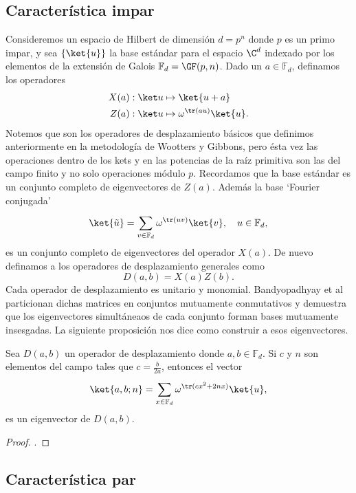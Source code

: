   \subsection{Característica impar}

  Consideremos un espacio de Hilbert de dimensión $d =
  p^{n}$ donde $p$ es un primo impar, y sea $\{\ket{u}\}$ la
  base estándar para el espacio $\C^{d}$ indexado por los
  elementos de la extensión de Galois $\mathbb F_{d} =
  \GF(p,n)$. Dado un $a \in \mathbb F_d$, definamos los
  operadores
  \begin{align}
    X(a) &: \ket u \mapsto \ket{u+a} \\
    Z(a) &: \ket u \mapsto \omega^{\tr(au)} \ket{u}.
  \end{align}
  Notemos que son los operadores de desplazamiento básicos
  que definimos anteriormente en la metodología de Wootters
  y Gibbons, pero ésta vez las operaciones dentro de los
  kets y en las potencias de la raíz primitiva son las del
  campo finito y no solo operaciones módulo $p$. Recordamos
  que la base estándar es un conjunto completo de
  eigenvectores de $Z(a)$. Además la base `Fourier
  conjugada'
  \[
    \ket{\tilde u}
    = \sum_{v \in \mathbb F_d}^{} \omega^{\tr(uv)} \ket{v},
    \quad u \in \mathbb F_d,
  \] 
  es un conjunto completo de eigenvectores del operador
  $X(a)$. De nuevo definamos a los operadores de
  desplazamiento generales como
  \[
    D(a,b) = X(a)Z(b).
  \] 
  Cada operador de desplazamiento es unitario y monomial.
  Bandyopadhyay et al particionan dichas matrices en
  conjuntos mutuamente conmutativos y demuestra que los
  eigenvectores simultáneaos de cada conjunto forman bases
  mutuamente insesgadas. La siguiente proposición nos dice
  como construir a esos eigenvectores.
  \begin{proposition}
    Sea $D(a,b)$ un operador de desplazamiento donde $a,b
    \in \mathbb F_d$. Si $c$ y $n$ son elementos del campo
    tales que $c = \frac{b}{2a}$, entonces el vector
    \begin{equation}
      \ket{a,b; n}
      = \sum_{x \in \mathbb F_d}^{} \omega^{\tr(cx^2+2nx)}
      \ket{u},
    \end{equation}
    es un eigenvector de $D(a,b)$.
  \end{proposition}
  \begin{proof}
    .
  \end{proof}

  \subsection{Característica par}

